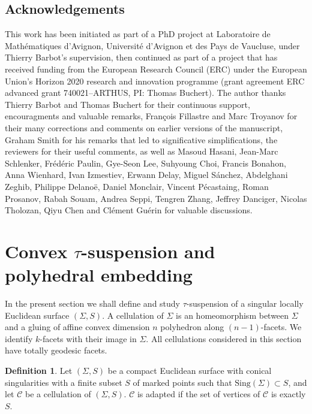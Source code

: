 \documentclass[a4paper,12pt]{article}
\def\sing{\mathrm{Sing}}
\def\Cell{\mathcal C}
\def\sing{\mathrm{Sing}}
\def\sing{\mathrm{Sing}}
\theoremstyle{definition}
\newtheorem{defi}[lem]{Definition}	%
\begin{document}
	\subsection*{Acknowledgements}
		This work has been initiated as part of a PhD project at Laboratoire de Mathématiques d'Avignon, Université d'Avignon et des Pays de Vaucluse, under Thierry Barbot's supervision, then continued as part of a project that has received funding from the European Research Council (ERC) under the European Union's Horizon 2020 research and innovation programme (grant agreement ERC advanced grant 740021--ARTHUS, PI: Thomas Buchert).  The author thanks Thierry Barbot and Thomas Buchert for their continuous support, encouragments and valuable remarks, François Fillastre and Marc Troyanov for their many corrections and comments on earlier versions of the manuscript, Graham Smith for his remarks that led to significative simplifications, the reviewers for their useful comments, as well as Masoud Hasani, Jean-Marc Schlenker, Frédéric Paulin, Gye-Seon Lee, Suhyoung Choi, Francis Bonahon, Anna Wienhard, Ivan Izmestiev, Erwann Delay, Miguel Sánchez, Abdelghani Zeghib, Philippe Delanoë, Daniel Monclair, Vincent Pécastaing, Roman Prosanov, Rabah Souam, Andrea Seppi, Tengren Zhang, Jeffrey Danciger, Nicolas Tholozan, Qiyu Chen and Clément Guérin for valuable discussions.
		
		

	
		
		
				\section{Convex $\tau$-suspension and polyhedral embedding}
				\label{sec:tau_susp}

						In the present section we shall define and study $\tau$-suspension of a singular locally Euclidean surface $(\Sigma, S)$.  A cellulation of $\Sigma$ is an homeomorphism between $\Sigma$ and a gluing of affine convex dimension $n$ polyhedron along $(n-1)$-facets. We identify $k$-facets with their image in $\Sigma$. All cellulations considered in this section have totally geodesic facets.
						
						
					\begin{defi}\label{def:compact_euclidean_surface_conical}
					Let $(\Sigma, S)$ be a compact Euclidean surface with conical singularities with a finite subset $S$ of marked points such that $\sing(\Sigma)\subset S$,
					and let $\Cell$ be a cellulation of $(\Sigma, S)$.
				$\Cell$ is adapted if the set of vertices of $\Cell$ is exactly $S$.

					 
					 
					\end{defi}
					
\end{document}
